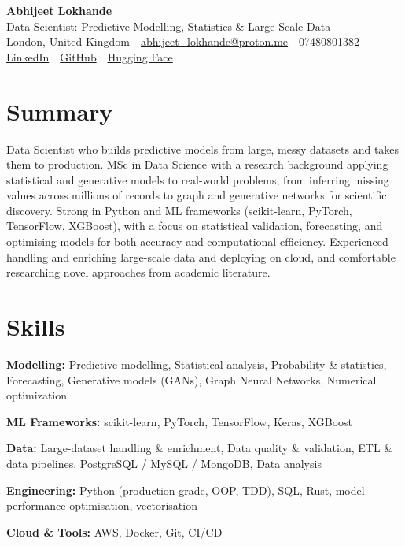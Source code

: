 \documentclass[10pt,a4paper]{article}
\newcommand{\sep}{\,\textcolor{accent!60}{\textbar}\,}
\begin{document}
\begin{center}
  {\fontsize{24}{26}\selectfont\bfseries Abhijeet Lokhande}\\[3pt]
  {\color{accent}\large Data Scientist: Predictive Modelling, Statistics \& Large-Scale Data}\\[5pt]
  {\small
    London, United Kingdom \sep
    \href{mailto:abhijeet_lokhande@proton.me}{abhijeet\_lokhande@proton.me} \sep
    07480801382 \\[2pt]
    \href{https://www.linkedin.com/in/ablds/}{LinkedIn} \sep
    \href{https://github.com/abhijeetscode}{GitHub} \sep
    \href{https://huggingface.co/ab-ai}{Hugging Face}
  }
\end{center}
\vspace{2pt}

\section{Summary}
Data Scientist who builds predictive models from large, messy datasets and takes them to production. MSc in Data Science with a research background applying statistical and generative models to real-world problems, from inferring missing values across millions of records to graph and generative networks for scientific discovery. Strong in Python and ML frameworks (scikit-learn, PyTorch, TensorFlow, XGBoost), with a focus on statistical validation, forecasting, and optimising models for both accuracy and computational efficiency. Experienced handling and enriching large-scale data and deploying on cloud, and comfortable researching novel approaches from academic literature.

\section{Skills}
\begin{tight}
  \item[\textcolor{accent}{\small$\bullet$}] \textbf{Modelling:} Predictive modelling, Statistical analysis, Probability \& statistics, Forecasting, Generative models (GANs), Graph Neural Networks, Numerical optimization
  \item[\textcolor{accent}{\small$\bullet$}] \textbf{ML Frameworks:} scikit-learn, PyTorch, TensorFlow, Keras, XGBoost
  \item[\textcolor{accent}{\small$\bullet$}] \textbf{Data:} Large-dataset handling \& enrichment, Data quality \& validation, ETL \& data pipelines, PostgreSQL / MySQL / MongoDB, Data analysis
  \item[\textcolor{accent}{\small$\bullet$}] \textbf{Engineering:} Python (production-grade, OOP, TDD), SQL, Rust, model performance optimisation, vectorisation
  \item[\textcolor{accent}{\small$\bullet$}] \textbf{Cloud \& Tools:} AWS, Docker, Git, CI/CD
\end{tight}
\end{document}
